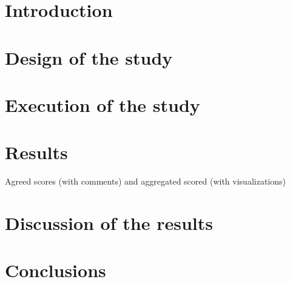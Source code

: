 \section{Introduction}

\section{Design of the study}

\section{Execution of the study}

\section{Results}
Agreed scores (with comments) and aggregated scored (with visualizations)

\section{Discussion of the results}

\section{Conclusions}
